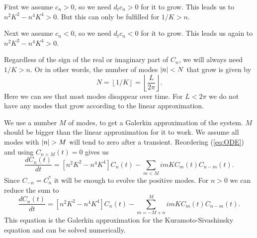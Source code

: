 First we assume $c_n > 0$, so we need $d_t c_n > 0$ for it to grow.
This leads us to $n^2 K^2 - n^4 K^4 > 0$. But this can only be fulfilled for $1/K > n$.

Next we assume $c_n < 0$, so we need $d_t c_n < 0$ for it to grow.
This leads us again to $n^2 K^2 - n^4 K^4 > 0$.

Regardless of the sign of the real or imaginary part of $C_n$, we will always need $1/K > n$. Or in other words, the number of modes $\left\vert n \right\vert < N$ that grow is given by
\begin{equation}
  N = \left \lfloor{1/K}\right \rfloor = \left \lfloor{\frac{L}{2\pi}}\right \rfloor.
\end{equation}
Here we can see that most modes disappear over time.
For $L < 2 \pi$ we do not have any modes that grow according to the linear approximation.

We use a number $M$ of modes, to get a Galerkin approximation of the system. $M$ should be bigger than the linear approximation for it to work. We assume all modes with $\left\vert n \right\vert > M$ will tend to zero after a transient. Reordering (\ref{eq:ODE}) and using $C_{n > M}(t) = 0$ gives us
\begin{equation}
    \frac{d C_n(t)}{dt} = \left[ n^2 K^2 - n^4 K^4 \right] C_n(t) - \sum_{m < M} i m K C_m(t) C_{n - m}(t).
\end{equation}
Since $C_{-n} = C_n^*$ it will be enough to evolve the positive modes. For $n > 0$ we can reduce the sum to
\begin{equation}
  \frac{d C_n(t)}{dt} = \left[ n^2 K^2 - n^4 K^4 \right] C_n(t) - \sum_{m = -M + n}^{M} i m K C_m(t) C_{n - m}(t).
\end{equation}
This equation is the Galerkin approximation for the Kuramoto-Sivashinsky equation and can be solved numerically.
